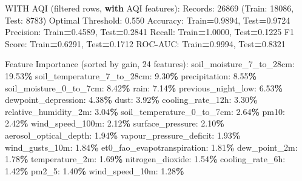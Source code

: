 \documentclass[
  letterpaper,
  DIV=11,
  numbers=noendperiod]{scrartcl}
\newenvironment{Shaded}{\begin{snugshade}}{\end{snugshade}}
\newcommand{\BuiltInTok}[1]{#1}
\newcommand{\ControlFlowTok}[1]{\textcolor[rgb]{0.13,0.29,0.53}{\textbf{#1}}}
\newcommand{\DecValTok}[1]{\textcolor[rgb]{0.00,0.00,0.81}{#1}}
\newcommand{\FloatTok}[1]{\textcolor[rgb]{0.00,0.00,0.81}{#1}}
\newcommand{\NormalTok}[1]{#1}
\newcommand{\OperatorTok}[1]{\textcolor[rgb]{0.81,0.36,0.00}{\textbf{#1}}}
\begin{document}
\begin{Shaded}
\begin{Highlighting}[]
\NormalTok{WITH AQI (filtered rows, }\ControlFlowTok{with}\NormalTok{ AQI features):}
\NormalTok{  Records: }\DecValTok{26869}\NormalTok{ (Train: }\DecValTok{18086}\NormalTok{, Test: }\DecValTok{8783}\NormalTok{)}
\NormalTok{  Optimal Threshold: }\FloatTok{0.550}
\NormalTok{  Accuracy: Train}\OperatorTok{=}\FloatTok{0.9894}\NormalTok{, Test}\OperatorTok{=}\FloatTok{0.9724}
\NormalTok{  Precision: Train}\OperatorTok{=}\FloatTok{0.4589}\NormalTok{, Test}\OperatorTok{=}\FloatTok{0.2841}
\NormalTok{  Recall: Train}\OperatorTok{=}\FloatTok{1.0000}\NormalTok{, Test}\OperatorTok{=}\FloatTok{0.1225}
\NormalTok{  F1 Score: Train}\OperatorTok{=}\FloatTok{0.6291}\NormalTok{, Test}\OperatorTok{=}\FloatTok{0.1712}
\NormalTok{  ROC}\OperatorTok{{-}}\NormalTok{AUC: Train}\OperatorTok{=}\FloatTok{0.9994}\NormalTok{, Test}\OperatorTok{=}\FloatTok{0.8321}

\NormalTok{  Feature Importance (}\BuiltInTok{sorted}\NormalTok{ by gain, }\DecValTok{24}\NormalTok{ features):}
\NormalTok{    soil\_moisture\_7\_to\_28cm: }\FloatTok{19.53}\OperatorTok{\%}
\NormalTok{    soil\_temperature\_7\_to\_28cm: }\FloatTok{9.30}\OperatorTok{\%}
\NormalTok{    precipitation: }\FloatTok{8.55}\OperatorTok{\%}
\NormalTok{    soil\_moisture\_0\_to\_7cm: }\FloatTok{8.42}\OperatorTok{\%}
\NormalTok{    rain: }\FloatTok{7.14}\OperatorTok{\%}
\NormalTok{    previous\_night\_low: }\FloatTok{6.53}\OperatorTok{\%}
\NormalTok{    dewpoint\_depression: }\FloatTok{4.38}\OperatorTok{\%}
\NormalTok{    dust: }\FloatTok{3.92}\OperatorTok{\%}
\NormalTok{    cooling\_rate\_12h: }\FloatTok{3.30}\OperatorTok{\%}
\NormalTok{    relative\_humidity\_2m: }\FloatTok{3.04}\OperatorTok{\%}
\NormalTok{    soil\_temperature\_0\_to\_7cm: }\FloatTok{2.64}\OperatorTok{\%}
\NormalTok{    pm10: }\FloatTok{2.42}\OperatorTok{\%}
\NormalTok{    wind\_speed\_100m: }\FloatTok{2.12}\OperatorTok{\%}
\NormalTok{    surface\_pressure: }\FloatTok{2.10}\OperatorTok{\%}
\NormalTok{    aerosol\_optical\_depth: }\FloatTok{1.94}\OperatorTok{\%}
\NormalTok{    vapour\_pressure\_deficit: }\FloatTok{1.93}\OperatorTok{\%}
\NormalTok{    wind\_gusts\_10m: }\FloatTok{1.84}\OperatorTok{\%}
\NormalTok{    et0\_fao\_evapotranspiration: }\FloatTok{1.81}\OperatorTok{\%}
\NormalTok{    dew\_point\_2m: }\FloatTok{1.78}\OperatorTok{\%}
\NormalTok{    temperature\_2m: }\FloatTok{1.69}\OperatorTok{\%}
\NormalTok{    nitrogen\_dioxide: }\FloatTok{1.54}\OperatorTok{\%}
\NormalTok{    cooling\_rate\_6h: }\FloatTok{1.42}\OperatorTok{\%}
\NormalTok{    pm2\_5: }\FloatTok{1.40}\OperatorTok{\%}
\NormalTok{    wind\_speed\_10m: }\FloatTok{1.28}\OperatorTok{\%}


\end{Highlighting}
\end{Shaded}
\end{document}
